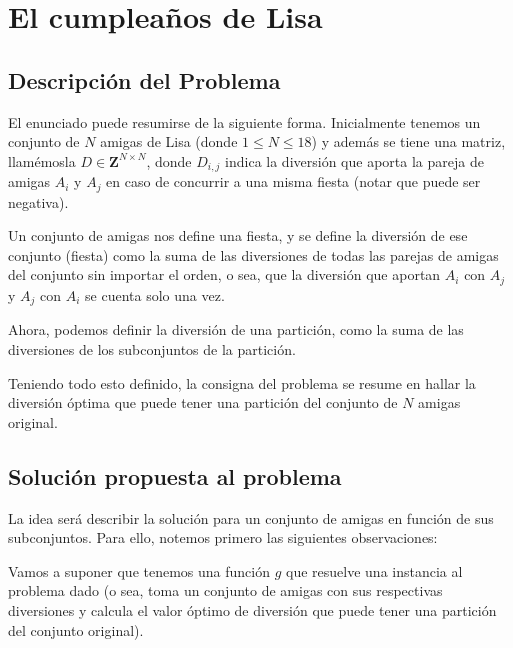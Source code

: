 \newpage{}
\section*{El cumpleaños de Lisa}

\subsection*{Descripción del Problema}

El enunciado puede resumirse de la siguiente forma. Inicialmente tenemos un conjunto de $N$ amigas de Lisa (donde $ 1 \leq N \leq 18$) y además se tiene una matriz, llamémosla $D \in \mathbf{Z}^{N \times N}$, donde $D_{i,j}$ indica la diversión que aporta la pareja de amigas $A_i$ y $A_j$ en caso de concurrir a una misma fiesta (notar que puede ser negativa).

Un conjunto de amigas nos define una fiesta, y se define la diversión de ese conjunto (fiesta) como la suma de las diversiones de todas las parejas de amigas del conjunto sin importar el orden, o sea, que la diversión que aportan $A_i$ con $A_j$ y $A_j$ con $A_i$ se cuenta solo una vez.

Ahora, podemos definir la diversión de una partición, como la suma de las diversiones de los subconjuntos de la partición.

Teniendo todo esto definido, la consigna del problema se resume en hallar la diversión óptima que puede tener una partición del conjunto de $N$ amigas original. 

\subsection*{Solución propuesta al problema}

La idea será describir la solución para un conjunto de amigas en función de sus subconjuntos. Para ello, notemos primero las siguientes observaciones:

Vamos a suponer que tenemos una función $g$ que resuelve una instancia al problema dado (o sea, toma un conjunto de amigas con sus respectivas diversiones y calcula el valor óptimo de diversión que puede tener una partición del conjunto original).

